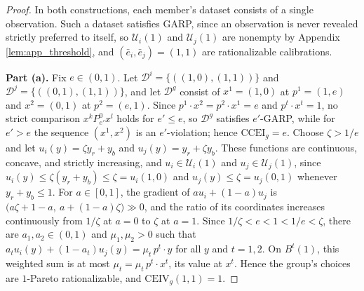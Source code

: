 \documentclass[11 pt]{article}
\begin{document}
\begin{proof}
In both constructions, each member's dataset consists of a single observation. Such a dataset satisfies GARP, since an observation is never revealed strictly preferred to itself, so $\mathcal{U}_{i}(1)$ and $\mathcal{U}_{j}(1)$ are nonempty by Appendix \autoref{lem:app_threshold}, and $(\bar e_{i}, \bar e_{j}) = (1,1)$ are rationalizable calibrations.

\textbf{Part (a).} Fix $e \in (0,1)$. Let $\mathcal{D}^{i} = \{ ((1,0), (1,1)) \}$ and $\mathcal{D}^{j} = \{ ((0,1), (1,1)) \}$, and let $\mathcal{D}^{g}$ consist of $x^{1} = (1,0)$ at $p^{1} = (1, e)$ and $x^{2} = (0,1)$ at $p^{2} = (e, 1)$. Since $p^{1} \cdot x^{2} = p^{2} \cdot x^{1} = e$ and $p^{t} \cdot x^{t} = 1$, no strict comparison $x^{k} \mathrel{P^{0}_{e'}} x^{l}$ holds for $e' \leq e$, so $\mathcal{D}^{g}$ satisfies $e'$-GARP, while for $e' > e$ the sequence $(x^{1}, x^{2})$ is an $e'$-violation; hence $\mathrm{CCEI}_{g} = e$. Choose $\zeta > 1/e$ and let $u_{i}(y) = \zeta y_{r} + y_{b}$ and $u_{j}(y) = y_{r} + \zeta y_{b}$. These functions are continuous, concave, and strictly increasing, and $u_{i} \in \mathcal{U}_{i}(1)$ and $u_{j} \in \mathcal{U}_{j}(1)$, since $u_{i}(y) \leq \zeta (y_{r} + y_{b}) \leq \zeta = u_{i}(1,0)$ and $u_{j}(y) \leq \zeta = u_{j}(0,1)$ whenever $y_{r} + y_{b} \leq 1$. For $a \in [0,1]$, the gradient of $a u_{i} + (1-a) u_{j}$ is $\bigl( a \zeta + 1 - a,\ a + (1-a) \zeta \bigr) \gg 0$, and the ratio of its coordinates increases continuously from $1/\zeta$ at $a = 0$ to $\zeta$ at $a = 1$. Since $1/\zeta < e < 1 < 1/e < \zeta$, there are $a_{1}, a_{2} \in (0,1)$ and $\mu_{1}, \mu_{2} > 0$ such that $a_{t} u_{i}(y) + (1-a_{t}) u_{j}(y) = \mu_{t}\, p^{t} \cdot y$ for all $y$ and $t = 1, 2$. On $B^{t}(1)$, this weighted sum is at most $\mu_{t} = \mu_{t}\, p^{t} \cdot x^{t}$, its value at $x^{t}$. Hence the group's choices are $1$-Pareto rationalizable, and $\mathrm{CEIV}_{g}(1,1) = 1$.


\end{proof}
\end{document}
